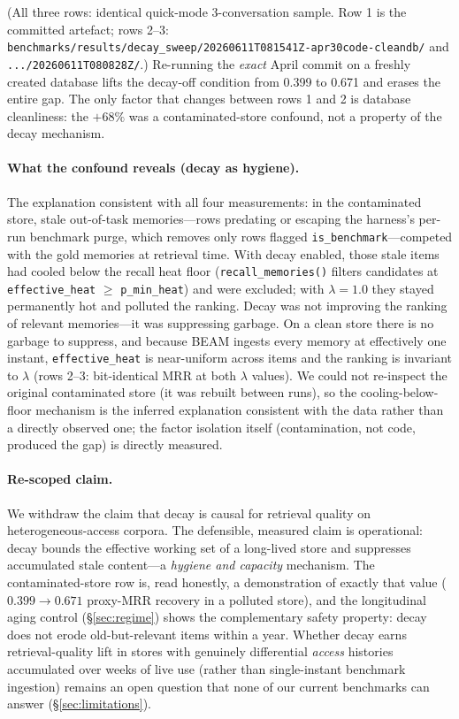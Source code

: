 \documentclass[11pt]{article}
\begin{document}
\noindent (All three rows: identical quick-mode 3-conversation
sample.  Row 1 is the committed artefact; rows 2--3:
\texttt{benchmarks/results/decay\_sweep/20260611T081541Z-apr30code-cleandb/}
and \texttt{.../20260611T080828Z/}.)  Re-running the \emph{exact}
April commit on a freshly created database lifts the decay-off
condition from 0.399 to 0.671 and erases the entire gap.  The only
factor that changes between rows 1 and 2 is database cleanliness:
the $+68\%$ was a contaminated-store confound, not a property of the
decay mechanism.

\paragraph{What the confound reveals (decay as hygiene).}
The explanation consistent with all four measurements: in the
contaminated store, stale out-of-task memories---rows predating or
escaping the harness's per-run benchmark purge, which removes only
rows flagged \texttt{is\_benchmark}---competed with the gold
memories at retrieval time.  With decay
enabled, those stale items had cooled below the recall heat floor
(\texttt{recall\_memories()} filters candidates at
\texttt{effective\_heat} $\geq$ \texttt{p\_min\_heat}) and were
excluded; with $\lambda = 1.0$ they stayed permanently hot and
polluted the ranking.  Decay was not improving the ranking of
relevant memories---it was suppressing garbage.  On a clean store
there is no garbage to suppress, and because BEAM ingests every
memory at effectively one instant, \texttt{effective\_heat} is
near-uniform across items and the ranking is invariant to $\lambda$
(rows 2--3: bit-identical MRR at both $\lambda$ values).  We could
not re-inspect the original contaminated store (it was rebuilt
between runs), so the cooling-below-floor mechanism is the inferred
explanation consistent with the data rather than a directly observed
one; the factor isolation itself (contamination, not code, produced
the gap) is directly measured.

\paragraph{Re-scoped claim.}
We withdraw the claim that decay is causal for retrieval quality on
heterogeneous-access corpora.  The defensible, measured claim is
operational: decay bounds the effective working set of a long-lived
store and suppresses accumulated stale content---a \emph{hygiene and
capacity} mechanism.  The contaminated-store row is, read honestly,
a demonstration of exactly that value ($0.399 \to 0.671$ proxy-MRR
recovery in a polluted store), and the longitudinal aging control
(\S\ref{sec:regime}) shows the complementary safety property: decay
does not erode old-but-relevant items within a year.  Whether decay
earns retrieval-quality lift in stores with genuinely differential
\emph{access} histories accumulated over weeks of live use (rather
than single-instant benchmark ingestion) remains an open question
that none of our current benchmarks can answer
(\S\ref{sec:limitations}).
\end{document}

